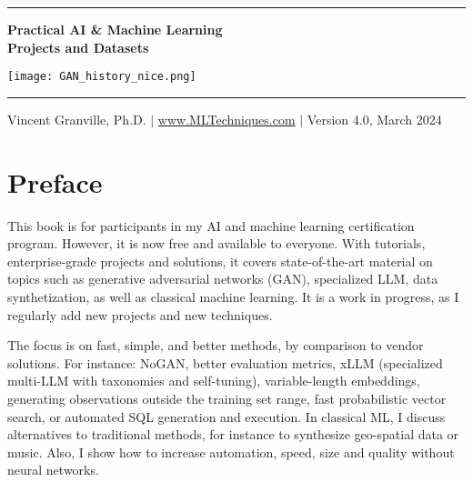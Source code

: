 \documentclass[oneside,10pt]{book}
\begin{document}
\hypersetup{linkcolor=blue}

\baselineskip
\thispagestyle{empty}
\hspace{0pt}
\vfill
\begin{center}
\rule{0.90\textwidth}{.4pt}
\end{center}

\begin{center}
{\Huge \bf{Practical AI \& Machine Learning \vspace{0.3ex}\\ Projects and Datasets} }  
\end{center}


\baselineskip
\addvspace{2cm}
\begin{center}
\texttt{[image: GAN\_history\_nice.png]}  
\end{center}
\addvspace{2cm}
\begin{center}
\rule{0.90\textwidth}{.4pt}
\end{center}
\begin{center}
Vincent Granville, Ph.D. $|$ \href{https://mltechniques.com/}{www.MLTechniques.com} $|$ Version 4.0, March 2024 
\end{center}

\hypersetup{linkcolor=red} %

\vfill
\hspace{0pt}
\pagebreak

\chapter*{Preface} %

This book is for participants in my AI and machine learning certification program. However, it is now free and available to everyone. With tutorials, enterprise-grade projects and solutions, it covers state-of-the-art material on topics such as generative adversarial networks (GAN), specialized LLM, data synthetization, as well as classical machine learning. It is a work in progress, as I regularly add new projects and new techniques.

The focus is on fast, simple, and better methods, by comparison to vendor solutions. For instance: NoGAN, better evaluation metrics, xLLM (specialized multi-LLM with taxonomies and self-tuning), variable-length embeddings, generating observations outside the training set range, fast probabilistic vector search, or automated SQL generation and execution. In classical ML, I discuss alternatives to traditional methods, for instance to synthesize geo-spatial data or music. Also, I show how to increase automation, speed, size and quality without neural networks.
\end{document}
